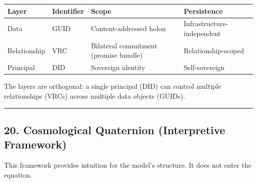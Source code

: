 \documentclass[
  11pt,
]{article}
\newcounter{none} %
\begin{document}
{\def\LTcaptype{none} %
\begin{longtable}[]{@{}
  >{\raggedright\arraybackslash}p{}
  >{\raggedright\arraybackslash}p{}
  >{\raggedright\arraybackslash}p{}
  >{\raggedright\arraybackslash}p{}@{}}
\toprule\noalign{}
\begin{minipage}[b]{\linewidth}\raggedright
Layer
\end{minipage} & \begin{minipage}[b]{\linewidth}\raggedright
Identifier
\end{minipage} & \begin{minipage}[b]{\linewidth}\raggedright
Scope
\end{minipage} & \begin{minipage}[b]{\linewidth}\raggedright
Persistence
\end{minipage} \\
\midrule\noalign{}
\endhead
\bottomrule\noalign{}
\endlastfoot
Data & GUID & Content-addressed holon & Infrastructure-independent \\
Relationship & VRC & Bilateral commitment (promise bundle) &
Relationship-scoped \\
Principal & DID & Sovereign identity & Self-sovereign \\
\end{longtable}
}

The layers are orthogonal: a single principal (DID) can control multiple
relationships (VRCs) across multiple data objects (GUIDs).

\begin{center}\rule{0.5\linewidth}{0.5pt}\end{center}

\subsection{20. Cosmological Quaternion (Interpretive
Framework)}\label{cosmological-quaternion-interpretive-framework}

This framework provides intuition for the model's structure. It does not
enter the equation.
\end{document}
